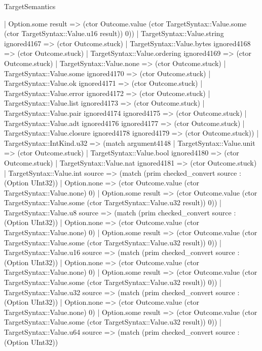 \begin{lexlean}{TargetSemantics}
\begin{semanticmodule}
{              | Option.some result => (ctor Outcome.value (ctor TargetSyntax::Value.some (ctor TargetSyntax::Value.u16 result)) 0))
            | TargetSyntax::Value.string ignored4167 => (ctor Outcome.stuck)
            | TargetSyntax::Value.bytes ignored4168 => (ctor Outcome.stuck)
            | TargetSyntax::Value.ordering ignored4169 => (ctor Outcome.stuck)
            | TargetSyntax::Value.none => (ctor Outcome.stuck)
            | TargetSyntax::Value.some ignored4170 => (ctor Outcome.stuck)
            | TargetSyntax::Value.ok ignored4171 => (ctor Outcome.stuck)
            | TargetSyntax::Value.error ignored4172 => (ctor Outcome.stuck)
            | TargetSyntax::Value.list ignored4173 => (ctor Outcome.stuck)
            | TargetSyntax::Value.pair ignored4174 ignored4175 => (ctor Outcome.stuck)
            | TargetSyntax::Value.adt ignored4176 ignored4177 => (ctor Outcome.stuck)
            | TargetSyntax::Value.closure ignored4178 ignored4179 => (ctor Outcome.stuck))
          | TargetSyntax::IntKind.u32 => (match argument4148
            | TargetSyntax::Value.unit => (ctor Outcome.stuck)
            | TargetSyntax::Value.bool ignored4180 => (ctor Outcome.stuck)
            | TargetSyntax::Value.nat ignored4181 => (ctor Outcome.stuck)
            | TargetSyntax::Value.int source => (match (prim checked_convert source : (Option UInt32))
              | Option.none => (ctor Outcome.value (ctor TargetSyntax::Value.none) 0)
              | Option.some result => (ctor Outcome.value (ctor TargetSyntax::Value.some (ctor TargetSyntax::Value.u32 result)) 0))
            | TargetSyntax::Value.u8 source => (match (prim checked_convert source : (Option UInt32))
              | Option.none => (ctor Outcome.value (ctor TargetSyntax::Value.none) 0)
              | Option.some result => (ctor Outcome.value (ctor TargetSyntax::Value.some (ctor TargetSyntax::Value.u32 result)) 0))
            | TargetSyntax::Value.u16 source => (match (prim checked_convert source : (Option UInt32))
              | Option.none => (ctor Outcome.value (ctor TargetSyntax::Value.none) 0)
              | Option.some result => (ctor Outcome.value (ctor TargetSyntax::Value.some (ctor TargetSyntax::Value.u32 result)) 0))
            | TargetSyntax::Value.u32 source => (match (prim checked_convert source : (Option UInt32))
              | Option.none => (ctor Outcome.value (ctor TargetSyntax::Value.none) 0)
              | Option.some result => (ctor Outcome.value (ctor TargetSyntax::Value.some (ctor TargetSyntax::Value.u32 result)) 0))
            | TargetSyntax::Value.u64 source => (match (prim checked_convert source : (Option UInt32))
}
\end{semanticmodule}
\end{lexlean}
